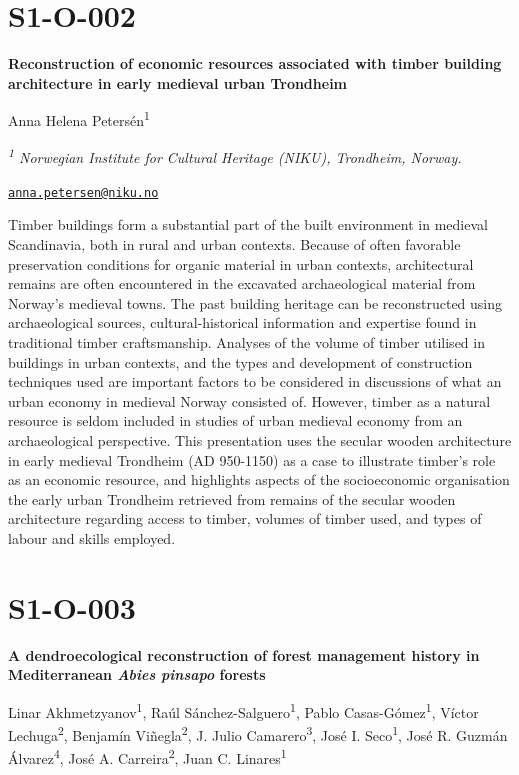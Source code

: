 \documentclass[
]{book}
\begin{document}
\hypertarget{s1-o-002}{%
\section*{S1-O-002}\label{s1-o-002}}

\textbf{Reconstruction of economic resources associated with timber building architecture in early medieval urban Trondheim}

Anna Helena Petersén\textsuperscript{1}

\emph{\textsuperscript{1} Norwegian Institute for Cultural Heritage (NIKU), Trondheim, Norway.}

\href{mailto:anna.petersen@niku.no}{\nolinkurl{anna.petersen@niku.no}}

Timber buildings form a substantial part of the built environment in medieval Scandinavia, both in rural and urban contexts. Because of often favorable preservation conditions for organic material in urban contexts, architectural remains are often encountered in the excavated archaeological material from Norway's medieval towns. The past building heritage can be reconstructed using archaeological sources, cultural-historical information and expertise found in traditional timber craftsmanship. Analyses of the volume of timber utilised in buildings in urban contexts, and the types and development of construction techniques used are important factors to be considered in discussions of what an urban economy in medieval Norway consisted of. However, timber as a natural resource is seldom included in studies of urban medieval economy from an archaeological perspective. This presentation uses the secular wooden architecture in early medieval Trondheim (AD 950-1150) as a case to illustrate timber's role as an economic resource, and highlights aspects of the socioeconomic organisation the early urban Trondheim retrieved from remains of the secular wooden architecture regarding access to timber, volumes of timber used, and types of labour and skills employed.

\hypertarget{s1-o-003}{%
\section*{S1-O-003}\label{s1-o-003}}

\textbf{A dendroecological reconstruction of forest management history in Mediterranean \emph{Abies pinsapo} forests}

Linar Akhmetzyanov\textsuperscript{1}, Raúl Sánchez-Salguero\textsuperscript{1}, Pablo Casas-Gómez\textsuperscript{1}, Víctor Lechuga\textsuperscript{2}, Benjamín Viñegla\textsuperscript{2}, J. Julio Camarero\textsuperscript{3}, José I. Seco\textsuperscript{1}, José R. Guzmán Álvarez\textsuperscript{4}, José A. Carreira\textsuperscript{2}, Juan C. Linares\textsuperscript{1}
\end{document}
